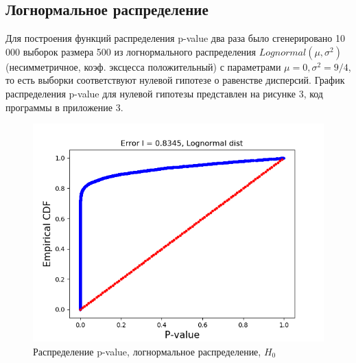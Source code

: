 \documentclass[12pt]{disser}
\begin{document}
\subsection*{Логнормальное распределение}
Для построения функций распределения p-value два раза было сгенерировано 10 000 выборок размера 500 из логнормального распределения $Lognormal(\mu, \sigma^2)$ (несимметричное, коэф. эксцесса положительный) с параметрами $\mu = 0, \sigma^2 = 9/4$, то есть выборки соответствуют нулевой гипотезе о равенстве дисперсий. График распределения p-value для нулевой гипотезы представлен на рисунке 3, код программы в приложение 3.
\begin{figure}[hbt!]
	
	\centering
	
	\includegraphics[width=0.8\linewidth]{Pvalue_longnormal_h0.png}
	\caption{Распределение p-value, логнормальное распределение, $H_0$}
	
	\label{fig:mpr}
	
\end{figure}
\end{document}

